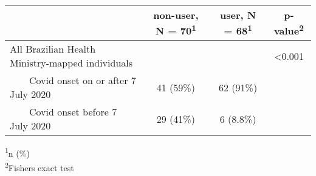 \setlength{\LTpost}{0mm}
\begin{longtable}{lccc}
\toprule
 & \textbf{non-user}, N = 70\textsuperscript{1} & \textbf{user}, N = 68\textsuperscript{1} & \textbf{p-value}\textsuperscript{2} \\ 
\midrule
All Brazilian Health Ministry-mapped individuals &  &  & <0.001 \\ 
    Covid onset on or after 7 July 2020 & 41 (59\%) & 62 (91\%) &  \\ 
    Covid onset before 7 July 2020 & 29 (41\%) & 6 (8.8\%) &  \\ 
\bottomrule
\end{longtable}
\begin{minipage}{\linewidth}
\textsuperscript{1}n (\%)\\
\textsuperscript{2}Fisher\textquotesingle{}s exact test\\
\end{minipage}

